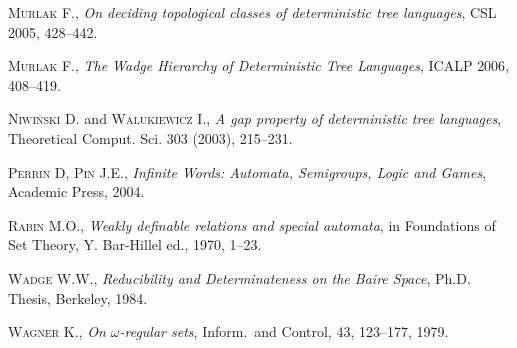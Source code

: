 \begin{thebibliography}{00}
\textsc{Murlak} F., \emph{On deciding topological classes of deterministic tree languages}, CSL \textsc{2005}, 428--442. 

\textsc{Murlak} F., \emph{The Wadge Hierarchy of Deterministic Tree Languages}, ICALP \textsc{2006}, 408--419. 

\textsc{Niwiński} D. and \textsc{Walukiewicz} I., \emph{A gap property of deterministic tree languages}, Theoretical Comput. Sci. \textsc{303} (2003), 215--231.



\textsc{Perrin} D, \textsc{Pin} J.E., \emph{Infinite Words: Automata, Semigroups, Logic and Games}, Academic Press, \textsc{2004}.

\textsc{Rabin} M.O., \emph{Weakly definable relations and special automata}, in Foundations of Set Theory, Y. Bar-Hillel ed., \textsc{1970}, 1--23.

\textsc{Wadge} W.W., \emph{Reducibility and Determinateness on the Baire Space}, Ph.D. Thesis, Berkeley, \textsc{1984}.

\textsc{Wagner} K., \emph{On $\omega$-regular sets}, Inform.~and Control, \textsc{43}, 123--177, 1979. 

\end{thebibliography}
